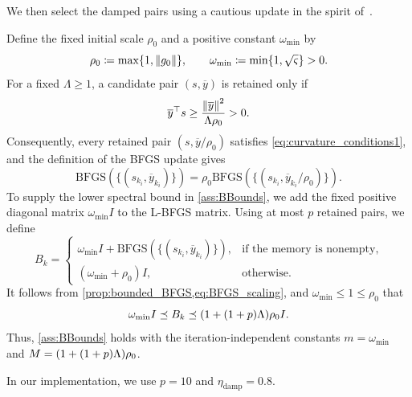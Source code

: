\documentclass[journal_revised_MPC]{subfiles}
\begin{document}
We then select the damped pairs using a cautious update in the spirit of~\citep{liGlobalConvergenceBFGS2001,mannelStructuredLBFGSMethod2024,mannelGlobalizationLBFGSBarzilai2025}.
\begin{MPCchange}
Define the fixed initial scale $\rho_0$ and a positive constant $\omega_{\min}$ by
\begin{equation*}
    \rho_0\coloneqq\max\{1,\norm{g_0}\},
    \qquad
    \omega_{\min}\coloneqq\min\{1,\sqrt{\varsigma}\}>0.
\end{equation*}
For a fixed $\Lambda\geq1$, a candidate pair $(s,\overline y)$ is retained only if
\begin{equation}\label{eq:implemented_cautious_test}
    \overline y^\top s\geq\frac{\norm{\overline y}^2}{\Lambda\rho_0}>0.
\end{equation}
Consequently, every retained pair $(s,\overline y/\rho_0)$ satisfies \cref{eq:curvature_conditions1}, and the definition of the BFGS update gives
\begin{equation}\label{eq:BFGS_scaling}
    \mathrm{BFGS}(\{(s_{k_i},\overline y_{k_i})\})
    =\rho_0\mathrm{BFGS}(\{(s_{k_i},\overline y_{k_i}/\rho_0)\}).
\end{equation}
To supply the lower spectral bound in \cref{ass:BBounds}, we add the fixed positive diagonal matrix $\omega_{\min}I$ to the L-BFGS matrix.
Using at most $p$ retained pairs, we define
\begin{equation}\label{eq:proposed_choice_of_Bk}
    B_k=
    \begin{cases}
        \omega_{\min}I+\mathrm{BFGS}(\{(s_{k_i},\overline y_{k_i})\}), & \text{if the memory is nonempty}, \\
        (\omega_{\min}+\rho_0)I,                                      & \text{otherwise}.
    \end{cases}
\end{equation}
It follows from \cref{prop:bounded_BFGS,eq:BFGS_scaling}, and $\omega_{\min}\leq1\leq\rho_0$ that
\begin{equation*}
    \omega_{\min}I\preceq B_k\preceq\qty(1+(1+p)\Lambda)\rho_0I.
\end{equation*}
Thus, \cref{ass:BBounds} holds with the iteration-independent constants $m=\omega_{\min}$ and $M=\qty(1+(1+p)\Lambda)\rho_0$.
\end{MPCchange}
In our implementation, we use $p=10$ and $\eta_{\mathrm{damp}}=0.8$.
\end{document}
